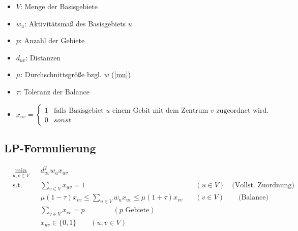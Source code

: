       \begin{itemize}
        \item $V$: Menge der Basisgebiete
        \item $w_u$: Aktivitätsmaß des Basisgebiets $u$
        \item $p$: Anzahl der Gebiete
        \item $d_{uv}$: Distanzen
        \item $\mu$: Durchschnittsgröße bzgl. $w$ (\eqref{mu})
        \item $\tau$: Toleranz der Balance
        \item \begin{equation*}
                    x_{uv} = 
                    \begin{cases}
                      1 & \text{falls Basisgebiet } u \text{ einem Gebit mit dem Zentrum } v \text{ zugeordnet wird.} \\
                      0 & sonst
                    \end{cases}
                \label{trivial wage scheme}
            \end{equation*}
      \end{itemize}
    

    \subsection{LP-Formulierung} %
    \label{sub:lp_formulierung}

      \begin{equation*}
        \begin{aligned}
          & \underset{u,v \in V}{\text{min}}
          & & d_{uv}^2w_{u}x_{uv}\\
          & \text{s.t.}
          & & \sum_{v \in V}x_{uv} = 1 & \quad (u \in V) \quad \text{(Vollst. Zuordnung)}\\ 
          & & & \mu(1 - \tau)x_{vv} \leq \sum_{u \in V}w_ux_{uv} \leq \mu(1 + \tau)x_{vv} &\quad  (v \in V)\quad \quad \text{(Balance)} \\
          & & &\sum_{v \in V}x_{vv} = p \qquad \qquad(p \text{ Gebiete})\\
          & & &x_{uv} \in \{0, 1\}  \qquad (u, v \in V)
        \end{aligned}
        \label{LEN principal problem}
      \end{equation*}
    
  
